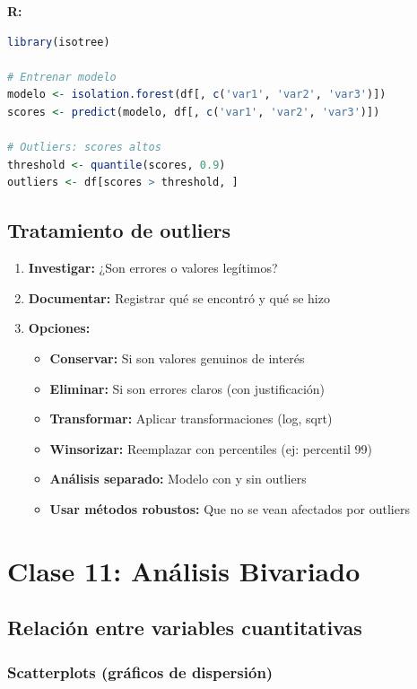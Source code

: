 \documentclass[a4paper,11pt]{article}
\begin{document}
\textbf{R:}
\begin{lstlisting}[language=R]
library(isotree)

# Entrenar modelo
modelo <- isolation.forest(df[, c('var1', 'var2', 'var3')])
scores <- predict(modelo, df[, c('var1', 'var2', 'var3')])

# Outliers: scores altos
threshold <- quantile(scores, 0.9)
outliers <- df[scores > threshold, ]
\end{lstlisting}

\subsection{Tratamiento de outliers}

\begin{enumerate}
    \item \textbf{Investigar:} ¿Son errores o valores legítimos?
    \item \textbf{Documentar:} Registrar qué se encontró y qué se hizo
    \item \textbf{Opciones:}
    \begin{itemize}
        \item \textbf{Conservar:} Si son valores genuinos de interés
        \item \textbf{Eliminar:} Si son errores claros (con justificación)
        \item \textbf{Transformar:} Aplicar transformaciones (log, sqrt)
        \item \textbf{Winsorizar:} Reemplazar con percentiles (ej: percentil 99)
        \item \textbf{Análisis separado:} Modelo con y sin outliers
        \item \textbf{Usar métodos robustos:} Que no se vean afectados por outliers
    \end{itemize}
\end{enumerate}

\section{Clase 11: Análisis Bivariado}

\subsection{Relación entre variables cuantitativas}

\subsubsection{Scatterplots (gráficos de dispersión)}
\end{document}
